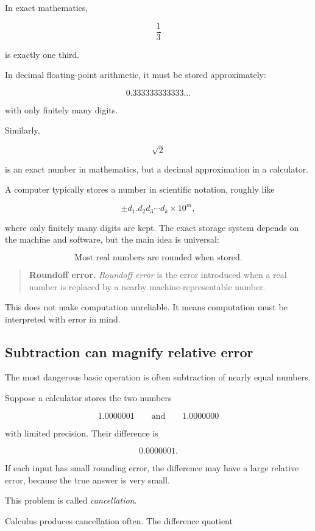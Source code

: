 In exact mathematics,

\[
\frac{1}{3}
\]

is exactly one third.

In decimal floating-point arithmetic, it must be stored approximately:

\[
0.333333333333\ldots
\]

with only finitely many digits.

Similarly,

\[
\sqrt2
\]

is an exact number in mathematics, but a decimal approximation in a calculator.

A computer typically stores a number in scientific notation, roughly like

\[
\pm d_1.d_2d_3\cdots d_k\times 10^m,
\]

where only finitely many digits are kept.  The exact storage system depends on the
machine and software, but the main idea is universal:

\[
\boxed{
\text{Most real numbers are rounded when stored.}
}
\]

\begin{quote}
\textbf{Roundoff error.}
\emph{Roundoff error} is the error introduced when a real number is replaced by a
nearby machine-representable number.
\end{quote}

This does not make computation unreliable.  It means computation must be interpreted
with error in mind.

\subsection{Subtraction can magnify relative error}
\label{appsubsec:cancellation}

The most dangerous basic operation is often subtraction of nearly equal numbers.

Suppose a calculator stores the two numbers

\[
1.0000001
\qquad\text{and}\qquad
1.0000000
\]

with limited precision.  Their difference is

\[
0.0000001.
\]

If each input has small rounding error, the difference may have a large relative error,
because the true answer is very small.

This problem is called \emph{cancellation}.

Calculus produces cancellation often.  The difference quotient

